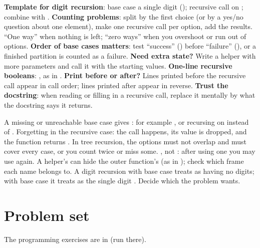 \documentclass[10pt]{scrartcl}
\begin{document}
\begin{shortcuts}
  \ii \textbf{Template for digit recursion}: base case a single digit (); recursive call on ; combine with .
  \ii \textbf{Counting problems}: split by the first choice (or by a yes/no question about one element), make one recursive call per option, add the results. ``One way'' when nothing is left; ``zero ways'' when you overshoot or run out of options.
  \ii \textbf{Order of base cases matters}: test ``success'' () before ``failure'' (), or a finished partition is counted as a failure.
  \ii \textbf{Need extra state?} Write a helper with more parameters and call it with the starting values.
  \ii \textbf{One-line recursive booleans}: , as in .
  \ii \textbf{Print before or after?} Lines printed before the recursive call appear in call order; lines printed after appear in reverse.
  \ii \textbf{Trust the docstring}: when reading or filling in a recursive call, replace it mentally by what the docstring says it returns.
\end{shortcuts}
\begin{trapbox}
  \ii A missing or unreachable base case gives : for example , or recursing on  instead of .
  \ii Forgetting  in the recursive case: the call happens, its value is dropped, and the function returns .
  \ii In tree recursion, the options must not overlap and must cover every case, or you count twice or miss some.
  \ii {}, not : after using one  you may use  again.
  \ii A helper's  can hide the outer function's  (as in ); check which frame each name belongs to.
  \ii A digit recursion with base case  treats  as having no digits; with base case  it treats  as the single digit . Decide which the problem wants.
\end{trapbox}

\clearpage
\section{Problem set}
The programming exercises are in  (run  there).
\end{document}
